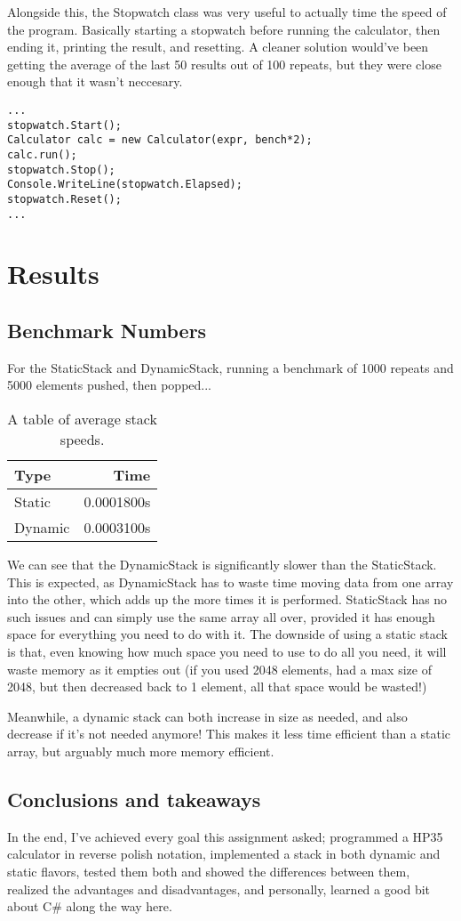 \documentclass{article}
\begin{document}
Alongside this, the Stopwatch class was very useful to actually time the speed of the program. Basically starting a stopwatch before running the calculator, then ending it, printing the result, and resetting. A cleaner solution would've been getting the average of the last 50 results out of 100 repeats, but they were close enough that it wasn't neccesary.
\begin{lstlisting}[Language = C#]
...
stopwatch.Start();
Calculator calc = new Calculator(expr, bench*2);
calc.run();
stopwatch.Stop();
Console.WriteLine(stopwatch.Elapsed);
stopwatch.Reset();
...
\end{lstlisting}


\section{Results}
\subsection{Benchmark Numbers}

For the StaticStack and DynamicStack, running a benchmark of 1000 repeats and 5000 elements pushed, then popped...

\begin{table}[h!]
\centering
\begin{tabular}{l|r}
Type & Time \\\hline
Static & 0.0001800s \\
Dynamic & 0.0003100s
\end{tabular}
\caption{\label{tab:widgets}A table of average stack speeds.}
\end{table}

We can see that the DynamicStack is significantly slower than the StaticStack. This is expected, as DynamicStack has to waste time moving data from one array into the other, which adds up the more times it is performed. StaticStack has no such issues and can simply use the same array all over, provided it has enough space for everything you need to do with it. 
The downside of using a static stack is that, even knowing how much space you need to use to do all you need, it will waste memory as it empties out (if you used 2048 elements, had a max size of 2048, but then decreased back to 1 element, all that space would be wasted!)

Meanwhile, a dynamic stack can both increase in size as needed, and also decrease if it's not needed anymore! This makes it less time efficient than a static array, but arguably much more memory efficient. 

\subsection{Conclusions and takeaways}

In the end, I've achieved every goal this assignment asked; programmed a HP35 calculator in reverse polish notation, implemented a stack in both dynamic and static flavors, tested them both and showed the differences between them, realized the advantages and disadvantages, and personally, learned a good bit about C# along the way here. 
\end{document}

